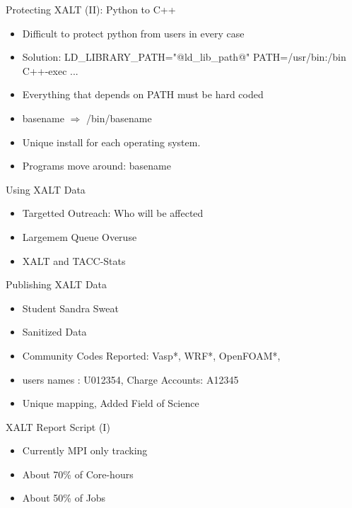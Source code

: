 \documentclass{beamer}
\begin{document}
\begin{frame}{Protecting XALT (II): Python to C++}
    \begin{itemize}
      \item Difficult to protect python from users in every case
      \item Solution: LD\_LIBRARY\_PATH="@ld\_lib\_path@"
        PATH=/usr/bin:/bin C++-exec ...
      \item Everything that depends on PATH must be hard coded
      \item basename $\Rightarrow$ /bin/basename
      \item Unique install for each operating system.
      \item Programs move around: basename
    \end{itemize}
\end{frame}

\begin{frame}{Using XALT Data}
  \begin{itemize}
    \item Targetted Outreach: Who will be affected
    \item Largemem Queue Overuse
    \item XALT and TACC-Stats
  \end{itemize}
\end{frame}

\begin{frame}{Publishing XALT Data}
  \begin{itemize}
    \item Student Sandra Sweat
    \item Sanitized Data
    \item Community Codes Reported: Vasp*, WRF*, OpenFOAM*,
    \item users names : U012354, Charge Accounts: A12345
    \item Unique mapping, Added Field of Science
  \end{itemize}
\end{frame}

\begin{frame}{XALT Report Script (I)}
  \begin{itemize}
    \item Currently MPI only tracking
    \item About 70\% of Core-hours
    \item About 50\% of Jobs
  \end{itemize}
\end{frame}
\end{document}
